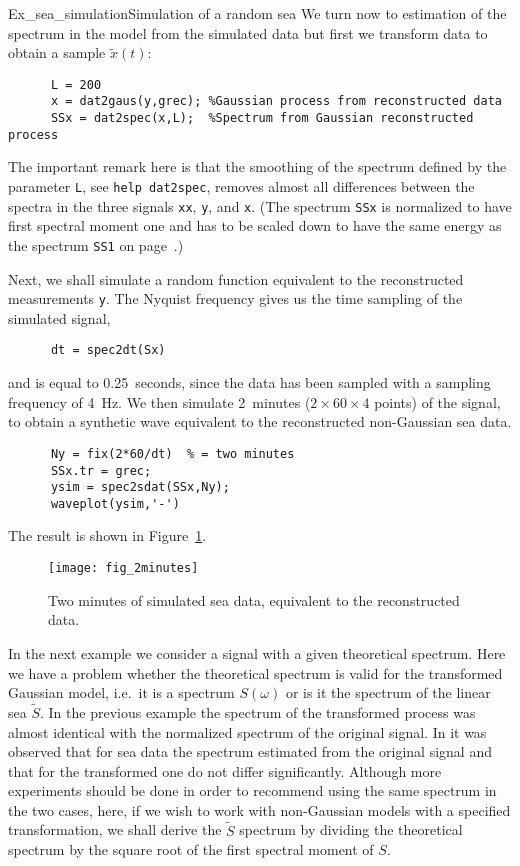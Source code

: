 \begin{rtex}{Ex_sea_simulation}{Simulation of a random sea}
We turn now to estimation of the spectrum in the model from the simulated
data but first we transform data to obtain a sample $\tilde x(t)$:
{\small\begin{verbatim}
      L = 200
      x = dat2gaus(y,grec); %Gaussian process from reconstructed data
      SSx = dat2spec(x,L);  %Spectrum from Gaussian reconstructed process
\end{verbatim}}
\noindent
The important remark here is that the smoothing of the spectrum defined
by the parameter {\tt L}, see {\tt help dat2spec}, removes almost
all differences between the spectra in the three signals {\tt xx}, {\tt y},
and {\tt x}.
(The spectrum {\tt SSx} is normalized to have first spectral moment one
and has to be scaled down to have the same energy as the spectrum {\tt SS1} on page~\pageref{page:SS1}.)

Next, we shall simulate a random function equivalent to the reconstructed
measurements {\tt y}. The Nyquist frequency gives us the time sampling
of the simulated signal,
{\small\begin{verbatim}
      dt = spec2dt(Sx)
\end{verbatim}}
\noindent
and is equal to 0.25~seconds, since the data has been sampled with a
sampling frequency of 4~Hz. We then simulate 2~minutes
($2\times 60\times 4$ points) of the signal, to obtain a
synthetic wave equivalent to the reconstructed non-Gaussian
sea data.
{\small\begin{verbatim}
      Ny = fix(2*60/dt)  % = two minutes
      SSx.tr = grec;
      ysim = spec2sdat(SSx,Ny);
      waveplot(ysim,'-')
\end{verbatim}}
\noindent The result is shown in Figure~\ref{fig_2minutes}.
\end{rtex}

\begin{figure}
\centering
  \texttt{[image: fig\_2minutes]}
\vspace{-3mm}
\caption[Two minutes of simulated sea data]{%
Two minutes of simulated sea data, equivalent to the
  reconstructed data.}
\label{fig_2minutes}
\end{figure}

In the next example we consider a signal with a given theoretical spectrum.
Here we have a problem whether the theoretical spectrum is valid for
the transformed Gaussian model, i.e.\ it is a spectrum $S(\omega)$ or is
it the spectrum of the linear sea $\widetilde S$. In the previous example
the spectrum of the transformed process was almost identical with the
normalized spectrum of the original signal. In
\cite{RychlikEtal1997Modelling} %
it was observed that for sea data the spectrum estimated from
the original signal and that for the transformed one do not
differ significantly. Although more experiments should be done in order to
recommend using the same spectrum in the two cases,
here, if we wish to work with non-Gaussian models with
a specified transformation, we shall derive the $\widetilde S$ spectrum
by dividing the theoretical spectrum
by the square root of the first spectral moment of $S$.

